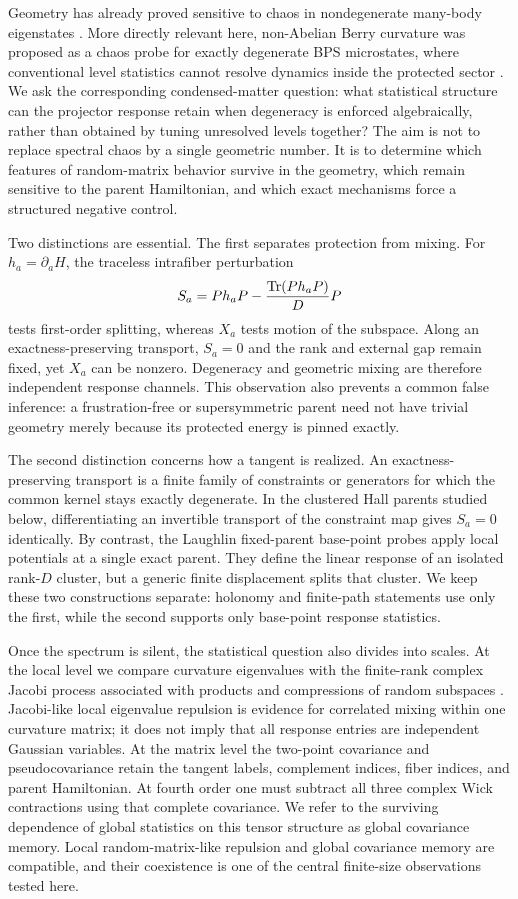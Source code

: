 Geometry has already proved sensitive to chaos in nondegenerate many-body
eigenstates \cite{pandey2020}.  More directly relevant here, non-Abelian
Berry curvature was proposed as a chaos probe for exactly degenerate BPS
microstates, where conventional level statistics cannot resolve dynamics
inside the protected sector \cite{chen2026}.  We ask the corresponding
condensed-matter question: what statistical structure can the projector
response retain when degeneracy is enforced algebraically, rather than
obtained by tuning unresolved levels together?  The aim is not to replace
spectral chaos by a single geometric number.  It is to determine which
features of random-matrix behavior survive in the geometry, which remain
sensitive to the parent Hamiltonian, and which exact mechanisms force a
structured negative control.

Two distinctions are essential.  The first separates protection from mixing.
For $h_a=\partial_aH$, the traceless intrafiber perturbation
\[
 S_a=Ph_aP-\frac{\operatorname{Tr}(Ph_aP)}{D}P
\]
tests first-order splitting, whereas $X_a$ tests motion of the subspace.
Along an exactness-preserving transport, $S_a=0$ and the rank and external gap
remain fixed, yet $X_a$ can be nonzero.  Degeneracy and geometric mixing are
therefore independent response channels.  This observation also prevents a
common false inference: a frustration-free or supersymmetric parent need not
have trivial geometry merely because its protected energy is pinned exactly.

The second distinction concerns how a tangent is realized.  An
exactness-preserving transport is a finite family of constraints or generators
for which the common kernel stays exactly degenerate.  In the clustered Hall
parents studied below, differentiating an invertible transport of the constraint
map gives $S_a=0$ identically.  By contrast, the Laughlin fixed-parent
base-point probes apply local potentials at a single exact parent.  They
define the linear response of an isolated rank-$D$ cluster, but a generic
finite displacement splits that cluster.  We keep these two constructions
separate: holonomy and finite-path statements use only the first, while the
second supports only base-point response statistics.

Once the spectrum is silent, the statistical question also divides into
scales.  At the local level we compare curvature eigenvalues with the
finite-rank complex Jacobi process associated with products and compressions
of random subspaces \cite{collins2005}.  Jacobi-like local eigenvalue
repulsion is evidence for correlated mixing within one curvature matrix; it
does not imply that all response entries are independent Gaussian variables.
At the matrix level the two-point covariance and pseudocovariance retain the
tangent labels, complement indices, fiber indices, and parent Hamiltonian.
At fourth order one must subtract all three complex Wick contractions using
that complete covariance.  We refer to the surviving dependence of global
statistics on this tensor structure as global covariance memory.  Local
random-matrix-like repulsion and global covariance memory are compatible, and
their coexistence is one of the central finite-size observations tested here.

